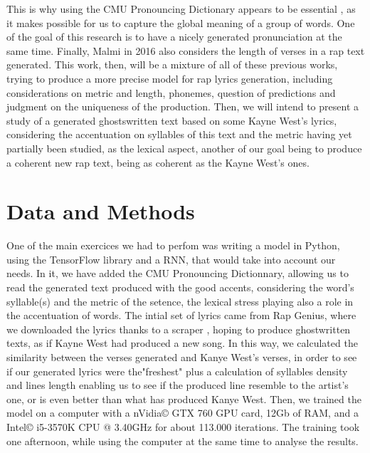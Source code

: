 \documentclass[12pt,a4paper]{article}
\begin{document}
This is why using the CMU Pronouncing Dictionary appears to be essential \cite{hirjee_using_2010}, as it makes possible for us to capture the global meaning of a group of words. One of the goal of this research is to have a nicely generated pronunciation at the same time. Finally, Malmi in 2016 \cite{malmi_dopelearning:_2016} also considers the length of verses in a rap text generated. This work, then, will be a mixture of all of these previous works, trying to produce a more precise model for rap lyrics generation, including considerations on metric and length, phonemes, question of predictions and judgment on the uniqueness of the production. Then, we will intend to present a study of a generated ghostswritten text based on some Kayne West's lyrics, considering the accentuation on syllables of this text and the metric having yet partially been studied, as the lexical aspect, another of our goal being to produce a coherent new rap text, being as coherent as the Kayne West's ones. \newline

\section{Data and Methods}

One of the main exercices we had to perfom was writing a model in Python, using the TensorFlow library and a RNN, that would take into account our needs. In it, we have added the CMU Pronouncing Dictionnary, allowing us to read the generated text produced with the good accents, considering the word's syllable(s) and the metric of the setence, the lexical stress playing also a role in the accentuation of words. The intial set of lyrics came from Rap Genius, where we downloaded the lyrics thanks to a scraper \cite{paupier_raplyrics-scraper_2018}, hoping to produce ghostwritten texts, as if Kayne West had produced a new song. In this way, we calculated the similarity between the verses generated and Kanye West's verses, in order to see if our generated lyrics were the"freshest" plus a calculation of syllables density and lines length enabling us to see if the produced line resemble to the artist’s one, or is even better than what has produced Kanye West. Then, we trained the model on a computer with a nVidia© GTX 760 GPU card, 12Gb of RAM, and a Intel©  i5-3570K CPU @ 3.40GHz for about 113.000 iterations. The training took one afternoon, while using the computer at the same time to analyse the results. \newline
\end{document}

